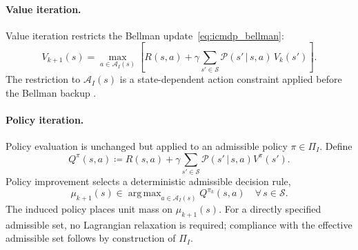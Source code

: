 \documentclass[journal]{IEEEtran}
\theoremstyle{definition}
\newcommand{\cS}{\mathcal{S}}
\newcommand{\cA}{\mathcal{A}}
\newcommand{\cP}{\mathcal{P}}
\newcommand{\argmax}{\operatorname{arg\,max}}
\newcommand{\given}{\,\vert\,}
\begin{document}
\paragraph{Value iteration.}
Value iteration restricts the Bellman update~\eqref{eq:icmdp_bellman}:
\begin{equation}
  V_{k+1}(s) = \max_{a \in \cA_I(s)}\left[R(s,a) + \gamma
  \sum_{s' \in \cS} \cP(s' \given s, a)\, V_k(s')\right].
  \label{eq:intent_vk}
\end{equation}
The restriction to $\cA_I(s)$ is a state-dependent action constraint applied
before the Bellman backup \citep{huang2022,lin2021actionconstrained}.

\paragraph{Policy iteration.}
Policy evaluation is unchanged but applied to an admissible policy
$\pi \in \Pi_I$. Define
\[
  Q^\pi(s,a)\coloneqq R(s,a)+\gamma\sum_{s'\in\cS}
  \cP(s'\given s,a)V^\pi(s').
\]
Policy improvement selects a deterministic admissible decision rule,
\begin{equation}
  \mu_{k+1}(s) \in \argmax_{a \in \cA_I(s)} Q^{\pi_k}(s,a)
  \quad \forall\, s \in \cS.
\end{equation}
The induced policy places unit mass on $\mu_{k+1}(s)$. For a directly specified
admissible set, no Lagrangian relaxation is required; compliance with the
effective admissible set follows by construction
of $\Pi_I$.
\end{document}
